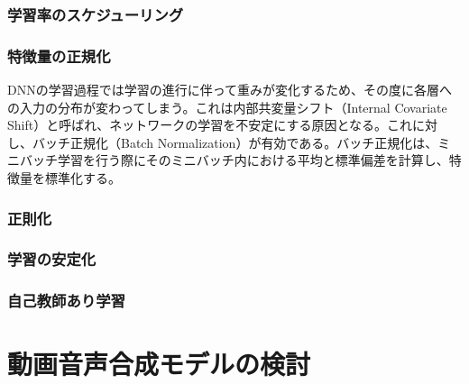 \documentclass[12pt]{jarticle}
\numberwithin{equation}{section}    %
\numberwithin{figure}{section}      %
\numberwithin{table}{section}      %
\begin{document}
\subsubsection{学習率のスケジューリング}
\subsubsection{特徴量の正規化}
DNNの学習過程では学習の進行に伴って重みが変化するため、その度に各層への入力の分布が変わってしまう。これは内部共変量シフト（Internal Covariate Shift）と呼ばれ、ネットワークの学習を不安定にする原因となる。これに対し、バッチ正規化（Batch Normalization）が有効である。バッチ正規化は、ミニバッチ学習を行う際にそのミニバッチ内における平均と標準偏差を計算し、特徴量を標準化する。
\subsubsection{正則化}
\subsubsection{学習の安定化}
\subsubsection{自己教師あり学習}

\clearpage

\section{動画音声合成モデルの検討}
\end{document}
